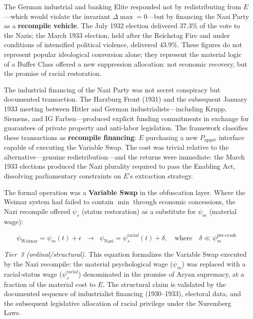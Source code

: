 The German industrial and banking Elite responded not by redistributing from $E$---which would violate the invariant $\Delta\max = 0$---but by financing the Nazi Party as a \textbf{recompile vehicle}. The July 1932 election delivered 37.3\% of the vote to the Nazis; the March 1933 election, held after the Reichstag Fire and under conditions of intensified political violence, delivered 43.9\%. These figures do not represent popular ideological conversion alone; they represent the material logic of a Buffer Class offered a new suppression allocation: not economic recovery, but the promise of racial restoration.

The industrial financing of the Nazi Party was not secret conspiracy but documented transaction. The Harzburg Front (1931) and the subsequent January 1933 meeting between Hitler and German industrialists---including Krupp, Siemens, and IG Farben---produced explicit funding commitments in exchange for guarantees of private property and anti-labor legislation. The framework classifies these transactions as \textbf{recompile financing}: $E$ purchasing a new $P_{\text{uppet}}$ interface capable of executing the Variable Swap. The cost was trivial relative to the alternative---genuine redistribution---and the returns were immediate: the March 1933 elections produced the Nazi plurality required to pass the Enabling Act, dissolving parliamentary constraints on $E$'s extraction strategy.

The formal operation was a \textbf{Variable Swap} in the obfuscation layer. Where the Weimar system had failed to contain $\min$ through economic concessions, the Nazi recompile offered $\psi_s$ (status restoration) as a substitute for $\psi_m$ (material wage):

\begin{equation}\label{eq:german-variable-swap}
\psi_{\text{Weimar}} = \psi_m(t) + \epsilon \;\;\rightarrow\;\; \psi_{\text{Nazi}} = \psi_s^{\text{racial}}(t) + \delta, \quad \text{where} \quad \delta \ll \psi_m^{\text{pre-crash}}
\end{equation}

\noindent\textit{Tier~3 (ordinal/structural).} This equation formalizes the Variable Swap executed by the Nazi recompile: the material psychological wage ($\psi_m$) was replaced with a racial-status wage ($\psi_s^{\text{racial}}$) denominated in the promise of Aryan supremacy, at a fraction of the material cost to $E$. The structural claim is validated by the documented sequence of industrialist financing (1930--1933), electoral data, and the subsequent legislative allocation of racial privilege under the Nuremberg Laws.


